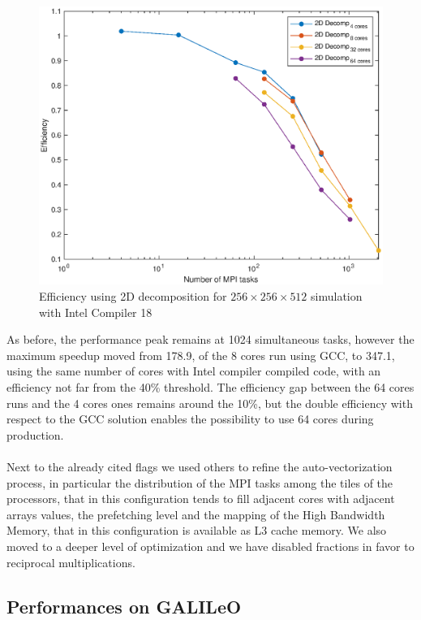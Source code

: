 \begin{figure}
\begin{center}
\includegraphics[scale=0.55]{grafici/intel_efficiency}
\caption{Efficiency using 2D decomposition for $256\times 256\times 512$  simulation with Intel Compiler 18}
\label{intel:efficiency}
\end{center}
\end{figure}

As before, the performance peak remains at 1024 simultaneous tasks, however the maximum speedup moved from 178.9, of the 8 cores run using GCC, to 347.1, using the same number of cores with Intel compiler compiled code, with an efficiency not far from the 40\% threshold.
The efficiency gap between the 64 cores runs and the 4 cores ones remains around the 10\%, but the double efficiency with respect to the GCC solution enables the possibility to use 64 cores during production.\\~\\

Next to the already cited flags we used others to refine the auto-vectorization process, in particular the distribution of the MPI tasks among the tiles of the processors, that in this configuration tends to fill adjacent cores with adjacent arrays values, the prefetching level and the mapping of the High Bandwidth Memory, that in this configuration is available as L3 cache memory.
We also moved to a deeper level of optimization and we have disabled fractions in favor to reciprocal multiplications.





\subsection{Performances on GALILeO}